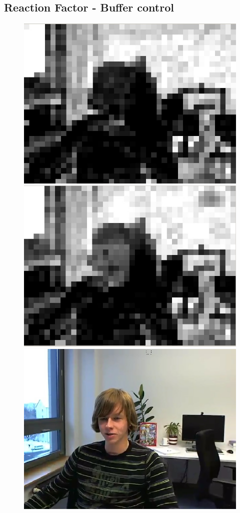 \documentclass[11pt]{article} %
\begin{document}
\subsection{Reaction Factor - Buffer control} 

\begin{figure}[!h]
	\centering
	\includegraphics[scale=0.4]{PaulDefault120_91250kbps_psnr}
	\includegraphics[scale=0.4]{BufferControl/paul120_250kbps_BufferControl_psnr}
	\includegraphics[scale=0.4]{PaulDefault120_91250kbps}

\end{figure}
\end{document}
